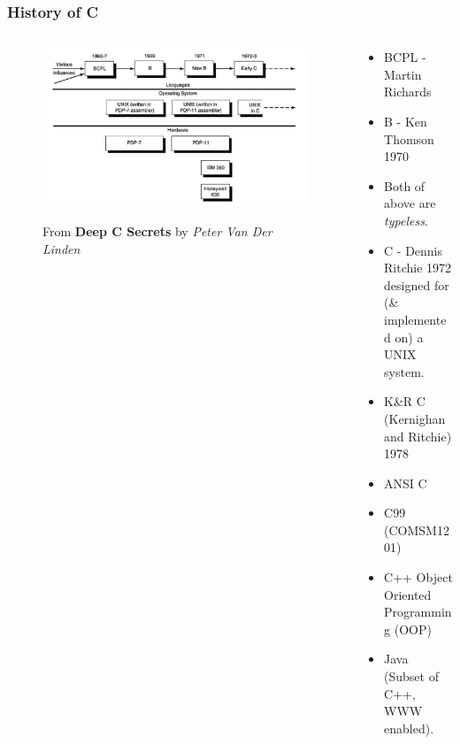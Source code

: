 \begin{frame}%
\frametitle{History of C}

\begin{columns}
\begin{column}{0.5\textwidth}

\begin{figure}[h]
\centerline{
\includegraphics[width=1.0\textwidth]{../Figs/evolvec.jpg}
}\centerline{
{\tiny From {\bf Deep C Secrets} by {\it Peter Van Der Linden}}
}
\end{figure}
\end{column}

\begin{column}{0.5\textwidth}
\begin{itemize}[<+->]
\item BCPL - Martin Richards
\item B - Ken Thomson 1970
\item Both of above are {\em typeless}.
\item C - Dennis Ritchie 1972 designed for\\(\& implemented on) a UNIX system.
\item K\&R C (Kernighan and Ritchie) 1978
\item ANSI C
\item C99 (COMSM1201)
\item C++ Object Oriented Programming (OOP)
\item Java (Subset of C++, WWW enabled).
\end{itemize}
\end{column}
\end{columns}
\end{frame}

